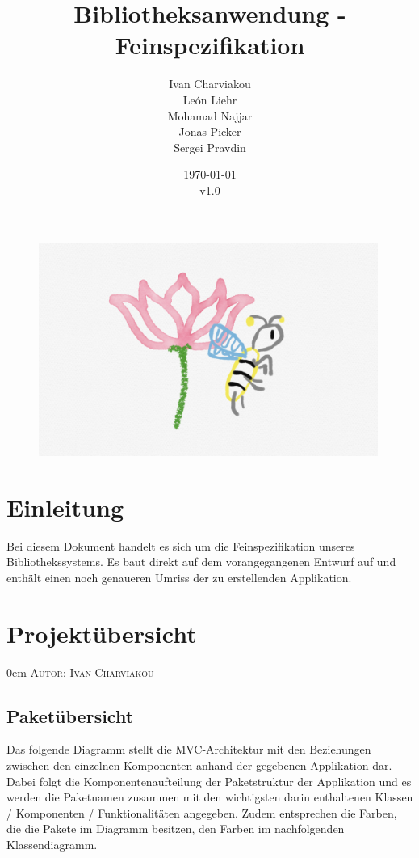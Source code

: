 \documentclass{article}
\title{Bibliotheksanwendung - Feinspezifikation}
\date{\today\\v1.0}
\author{
	Ivan Charviakou\\
	León Liehr\\
	Mohamad Najjar\\
	Jonas Picker\\
	Sergei Pravdin
}
\makeatletter
\newcommand{\sectionauthor}[1]{
	{\parindent 0em \large \scshape Autor: #1 \par \nobreak \vspace*{1em}}
	\@afterheading
}
\makeatother
\begin{document}
\maketitle
\begin{figure}[h]
	\centering
	\includegraphics[width = 30em]{Logo}
\end{figure}
\newpage
\tableofcontents
\newpage


\section{Einleitung}
Bei diesem Dokument handelt es sich um die Feinspezifikation unseres Bibliothekssystems. Es baut direkt auf dem vorangegangenen Entwurf auf und enthält einen noch genaueren Umriss der zu erstellenden Applikation.


\section{Projektübersicht}
\sectionauthor{Ivan Charviakou}

\subsection{Paketübersicht}
Das folgende Diagramm stellt die MVC-Architektur mit den Beziehungen zwischen den einzelnen Komponenten anhand der gegebenen Applikation dar.
Dabei folgt die Komponentenaufteilung der Paketstruktur der Applikation und es werden die Paketnamen zusammen mit den wichtigsten darin enthaltenen Klassen / Komponenten / Funktionalitäten angegeben.
Zudem entsprechen die Farben, die die Pakete im Diagramm besitzen, den Farben im nachfolgenden Klassendiagramm.
\end{document}
